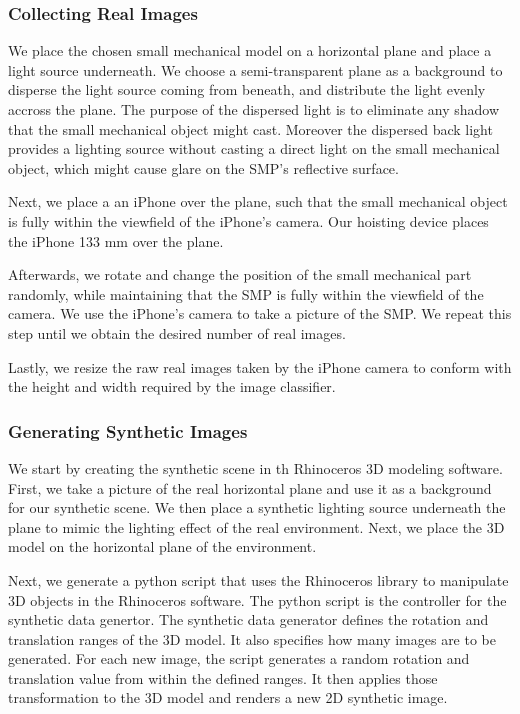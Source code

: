 \subsubsection{Collecting Real Images}
We place the chosen small mechanical model on a horizontal plane and place a light source underneath. We choose a semi-transparent plane as a background to disperse the light source coming from beneath, and distribute the light evenly accross the plane. The purpose of the dispersed light is to eliminate any shadow that the small mechanical object might cast. Moreover the dispersed back light provides a lighting source without casting a direct light on the small mechanical object, which might cause glare on the SMP's reflective surface.

Next, we place a an iPhone over the plane, such that the small mechanical object is fully within the viewfield of the iPhone's camera. Our hoisting device places the iPhone 133 mm over the plane.

Afterwards, we rotate and change the position of the small mechanical part randomly, while maintaining that the SMP is fully within the viewfield of the camera. We use the iPhone's camera to take a picture of the SMP. We repeat this step until we obtain the desired number of real images.

Lastly, we resize the raw real images taken by the iPhone camera to conform with the height and width required by the image classifier.

\subsubsection{Generating Synthetic Images}
We start by creating the synthetic scene in th Rhinoceros 3D modeling software. First, we take a picture of the real horizontal plane and use it as a background for our synthetic scene. We then place a synthetic lighting source underneath the plane to mimic the lighting effect of the real environment. Next, we place the 3D model on the horizontal plane of the environment.

Next, we generate a python script that uses the Rhinoceros library to manipulate 3D objects in the Rhinoceros software. The python script is the controller for the synthetic data genertor. The synthetic data generator defines the rotation and translation ranges of the 3D model. It also specifies how many images are to be generated. For each new image, the script generates a random rotation and translation value from within the defined ranges. It then applies those transformation to the 3D model and renders a new 2D synthetic image.

